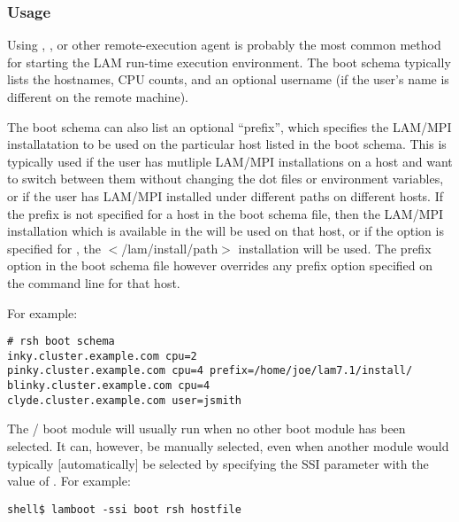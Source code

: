 
\subsubsection{Usage}

Using , , or other remote-execution agent is
probably the most common method for starting the LAM run-time
execution environment.  The boot schema typically lists the hostnames,
CPU counts, and an optional username (if the user's name is different
on the remote machine).  


The boot schema can also list an optional ``prefix'', which specifies
the LAM/MPI installatation to be used on the particular host listed in
the boot schema. This is typically used if the user has mutliple
LAM/MPI installations on a host and want to switch between them
without changing the dot files or  environment variables,
or if the user has LAM/MPI installed under different paths on
different hosts.  If the prefix is not specified for a host in the
boot schema file, then the LAM/MPI installation which is available in
the  will be used on that host, or if the  option is specified for , the
$<$/lam/install/path$>$ installation will be used.  The prefix option
in the boot schema file however overrides any prefix option specified
on the  command line for that host.

For example:

\lstset{style=lam-shell}
\begin{lstlisting}
# rsh boot schema
inky.cluster.example.com cpu=2
pinky.cluster.example.com cpu=4 prefix=/home/joe/lam7.1/install/
blinky.cluster.example.com cpu=4
clyde.cluster.example.com user=jsmith
\end{lstlisting}


The  /  boot module will usually run when no other
boot module has been selected.  It can, however, be manually selected,
even when another module would typically [automatically] be selected
by specifying the  SSI parameter with the value of
.  For example:

\lstset{style=lam-cmdline}
\begin{lstlisting}
shell$ lamboot -ssi boot rsh hostfile
\end{lstlisting}

